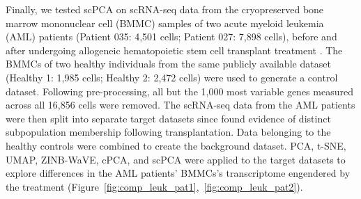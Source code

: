 Finally, we tested scPCA on scRNA-seq data from the cryopreserved bone marrow mononuclear cell (BMMC) samples of two acute myeloid leukemia (AML) patients (Patient 035: 4,501 cells; Patient 027: 7,898 cells), before and after undergoing allogeneic hematopoietic stem cell transplant treatment \cite{Zheng2017}. The BMMCs of two healthy individuals from the same publicly available dataset (Healthy 1: 1,985 cells; Healthy 2: 2,472 cells) were used to generate a control dataset. Following pre-processing, all but the 1,000 most variable genes measured across all 16,856 cells were removed. The scRNA-seq data from the AML patients were then split into separate target datasets since \citet{Zheng2017} found evidence of distinct subpopulation membership following transplantation. Data belonging to the healthy controls were combined to create the background dataset. PCA, t-SNE, UMAP, ZINB-WaVE, cPCA, and scPCA were applied to the target datasets to explore differences in the AML patients' BMMCs's transcriptome engendered by the treatment (Figure~\ref{fig:comp_leuk_pat1},~\ref{fig:comp_leuk_pat2}).

